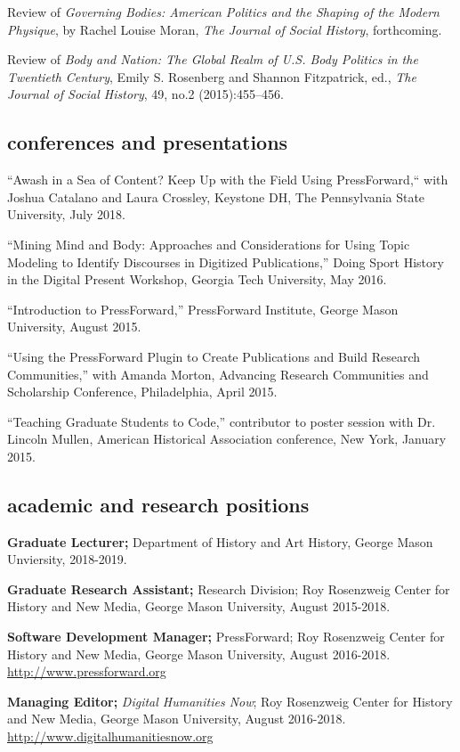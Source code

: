 \documentclass[11pt]{article}
\begin{document}
Review of \emph{Governing Bodies: American Politics and the Shaping of the Modern Physique}, by Rachel Louise Moran, \emph{The Journal of Social History}, forthcoming.

Review of \emph{Body and Nation: The Global Realm of U.S. Body Politics in the Twentieth Century}, Emily S. Rosenberg and Shannon Fitzpatrick, ed., \emph{The Journal of Social History}, 49, no.2 (2015):455–456.

\subsection{conferences and presentations}
``Awash in a Sea of Content? Keep Up with the Field Using PressForward,`` with Joshua Catalano and Laura Crossley, Keystone DH, The Pennsylvania State University, July 2018.

``Mining Mind and Body: Approaches and Considerations for Using Topic Modeling to Identify Discourses in Digitized Publications,'' Doing Sport History in the Digital Present Workshop, Georgia Tech University, May 2016.

``Introduction to PressForward,'' PressForward Institute, George Mason University, August 2015.

``Using the PressForward Plugin to Create Publications and Build Research Communities,'' with Amanda Morton, Advancing Research Communities and Scholarship Conference, Philadelphia, April 2015.

``Teaching Graduate Students to Code,'' contributor to poster session with Dr. Lincoln Mullen, American Historical Association conference, New York, January 2015.

\subsection{academic and research positions}
\textbf{Graduate Lecturer;} Department of History and Art History, George Mason Unviersity, 2018-2019.

\textbf{Graduate Research Assistant;} Research Division; Roy Rosenzweig Center for History and New Media, George Mason University, August 2015-2018.

\textbf{Software Development Manager;} PressForward; Roy Rosenzweig Center for History and New Media, George Mason University, August 2016-2018. \url{http://www.pressforward.org}

\textbf{Managing Editor;} \emph{Digital Humanities Now}; Roy Rosenzweig Center for History and New Media, George Mason University, August 2016-2018. \url{http://www.digitalhumanitiesnow.org}
\end{document}
